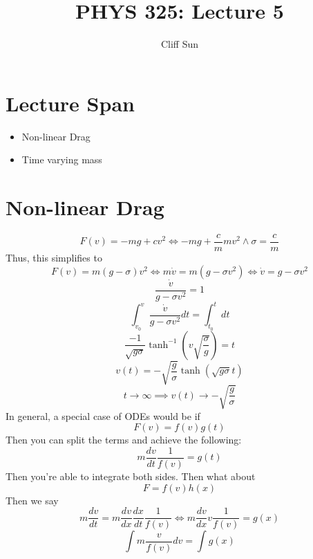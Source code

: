 \documentclass{article}
\title{PHYS 325: Lecture 5}
\author{Cliff Sun}
\newtheorem{one minute paper}[theorem]{One Minute Paper}
\begin{document}
\maketitle

\section*{Lecture Span}
\begin{itemize}
    \item Non-linear Drag
    \item Time varying mass
\end{itemize}

\section*{Non-linear Drag}

\begin{equation}
    F(v) = -mg + cv^2 \iff -mg + \frac{c}{m}mv^2 \land \sigma = \frac{c}{m}
\end{equation}
Thus, this simplifies to
\begin{equation}
    F(v) = m(g - \sigma)v^2 \iff m\dot{v} = m(g - \sigma v^2) \iff \boxed{\dot{v} = g-\sigma v^2}
\end{equation}
\begin{equation}
    \frac{\dot{v}}{g - \sigma v^2} = 1
\end{equation}
\begin{equation}
    \int_{v_0}^{v} \frac{\dot{v}}{g - \sigma v^2} dt = \int_{t_0}^{t} dt
\end{equation}
\begin{equation}
    \frac{-1}{\sqrt{g\sigma}}\tanh^{-1}\left(v\sqrt{\frac{\sigma}{g}}\right) = t
\end{equation}
\begin{equation}
    v(t) = -\sqrt{\frac{g}{\sigma}}\tanh\left(\sqrt{g \sigma} t\right)
\end{equation}
\begin{equation}
    t \rightarrow \infty \implies v(t) \rightarrow -\sqrt{\frac{g}{\sigma}}
\end{equation}
In general, a special case of ODEs would be if
\begin{equation}
    F(v) = f(v)g(t)
\end{equation}
Then you can split the terms and achieve the following:
\begin{equation}
    m\frac{dv}{dt}\frac{1}{f(v)} = g(t)
\end{equation}
Then you're able to integrate both sides. Then what about
\begin{equation}
    F = f(v)h(x)
\end{equation}
Then we say 
\begin{equation}
    m\frac{dv}{dt} = m\frac{dv}{dx}\frac{dx}{dt}\frac{1}{f(v)} \iff m\frac{dv}{dx}v \frac{1}{f(v)} = g(x)
\end{equation}
\begin{equation}
    \int m \frac{v}{f(v)} dv = \int g(x)
\end{equation}
\end{document}
